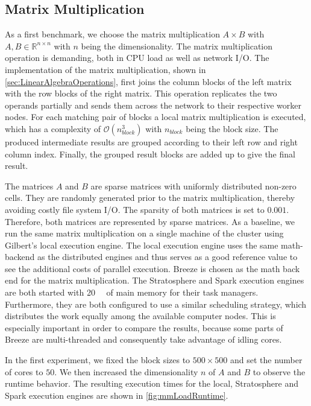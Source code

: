 \subsection{Matrix Multiplication}
\label{subsec:mm}

As a first benchmark, we choose the matrix multiplication $A\times B$ with $A,B \in \mathbb{R}^{n\times n}$ with $n$ being the dimensionality.
The matrix multiplication operation is demanding, both in CPU load as well as network I/O.
The implementation of the matrix multiplication, shown in \cref{sec:LinearAlgebraOperations}, first joins the column blocks of the left matrix with the row blocks of the right matrix.
This operation replicates the two operands partially and sends them across the network to their respective worker nodes.
For each matching pair of blocks a local matrix multiplication is executed, which has a complexity of $\mathcal{O}(n_{block}^3)$ with $n_{block}$ being the block size.
The produced intermediate results are grouped according to their left row and right column index.
Finally, the grouped result blocks are added up to give the final result.

The matrices $A$ and $B$ are sparse matrices with uniformly distributed non-zero cells.
They are randomly generated prior to the matrix multiplication, thereby avoiding costly file system I/O.
The sparsity of both matrices is set to $0.001$.
Therefore, both matrices are represented by sparse matrices.
As a baseline, we run the same matrix multiplication on a single machine of the cluster using Gilbert's local execution engine.
The local execution engine uses the same math-backend as the distributed engines and thus serves as a good reference value to see the additional costs of parallel execution.
Breeze is chosen as the math back end for the matrix multiplication.
The Stratosphere and Spark execution engines are both started with \SI{20}{\giga\byte} of main memory for their task managers.
Furthermore, they are both configured to use a similar scheduling strategy, which distributes the work equally among the available computer nodes.
This is especially important in order to compare the results, because some parts of Breeze are multi-threaded and consequently take advantage of idling cores.

In the first experiment, we fixed the block sizes to $500 \times 500$ and set the number of cores to $50$.
We then increased the dimensionality $n$ of $A$ and $B$ to observe the runtime behavior.
The resulting execution times for the local, Stratosphere and Spark execution engines are shown in \cref{fig:mmLoadRuntime}.

